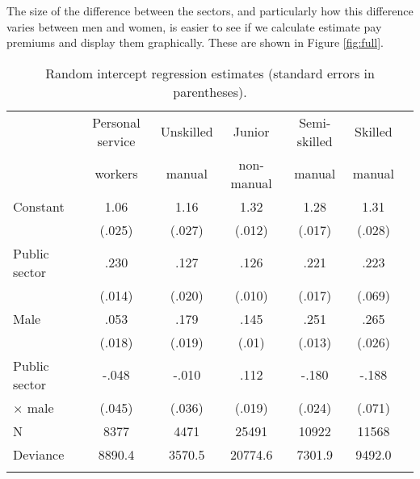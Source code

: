 \documentclass[a4paper,11pt,titlepage]{article}
\begin{document}
The size of the difference between the sectors, and particularly how this difference
varies between men and women, is easier to see if we calculate estimate pay premiums and display them graphically. These are shown in Figure \ref{fig:full}.

\begin{table}[tb]
\caption{Random intercept regression estimates (standard errors in parentheses).\label{tab:baseline}}
\begin{center}
\begin{tabular}{lcccccc}
\toprule
            &Personal service   &Unskilled &Junior      &Semi-skilled   &Skilled \\
            & workers           &manual    &non-manual  & manual        &manual \\
\midrule
Constant	&1.06 	            &1.16 	   &1.32	  	  &1.28 	        &1.31\\
					&(.025)	            &(.027)	   &(.012)	    &(.017)	        &(.028)\\
Public sector&.230		        &.127	   	 &.126			  &.221				    &.223\\
					&(.014)	            &(.020)	   &(.010)	    &(.017)	        &(.069)\\
Male			&.053							  &.179			 &.145			  &.251					  &.265\\
					&(.018)							&(.019)		 &(.01)				&(.013)					&(.026)\\
Public sector & -.048					&-.010		 &.112			  &-.180					&-.188\\
\quad $\times$ male &(.045)		&(.036)		 &(.019)			&(.024)					&(.071)\\
\midrule
N					&8377  	            &4471  	   &25491       &10922 	        &11568    \\
Deviance	&8890.4	            &3570.5	   &20774.6     &7301.9	        &9492.0\\
\\
\bottomrule
\end{tabular}


\end{center}
\end{table}
\end{document}
